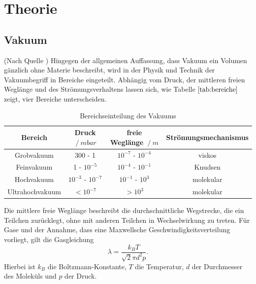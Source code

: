 \section{Theorie}
\subsection{Vakuum}
(Nach Quelle \cite{vakuum})
Hingegen der allgemeinen Auffassung, dass Vakuum ein Volumen gänzlich ohne Materie beschreibt, wird in der Physik und Technik
der Vakuumbegriff in Bereiche eingeteilt.
Abhängig vom Druck, der mittleren freien Weglänge und des Strömungsverhaltens lassen sich, wie Tabelle $\ref{tab:bereiche}$ zeigt, vier Bereiche unterscheiden.

\begin{table}[!hht]
\begin{tabular}{c c c c}
 Bereich & Druck $\:/\: mbar$ & freie Weglänge $\:/\: m$ & Strömungsmechanismus \\
 \midrule
 Grobvakuum & 300 - 1 & $10^{-7}$ - $10^{-4}$ & viskos \\
 Feinvakuum & 1 - $10^{-5}$ & $10^{-4}$ - $10^{-1}$ & Knudsen \\
 Hochvakuum & $10^{-3}$ - $10^{-7}$ & $10^{-1}$ - $10^3$ & molekular \\
 Ultrahochvakuum & $< 10^{-7}$ & $> 10^3$ & molekular \\
\end{tabular}
\caption{Bereichseinteilung des Vakuums}
\label{tab:bereiche}
\end{table}

Die mittlere freie Weglänge beschreibt die durchschnittliche Wegstrecke, die ein Teilchen zurücklegt, ohne mit anderen Teilchen in Wechselwirkung zu treten.
Für Gase und der Annahme, dass eine Maxwellsche Geschwindigkeitsverteilung vorliegt, gilt die Gasgleichung
\begin{equation}
  \lambda = \frac{k_B T}{\sqrt{2}\pi d^2p}.
\end{equation}
Hierbei ist $k_B$ die Boltzmann-Konstante, $T$ die Temperatur, $d$ der Durchmesser des Moleküls und $p$ der Druck.
